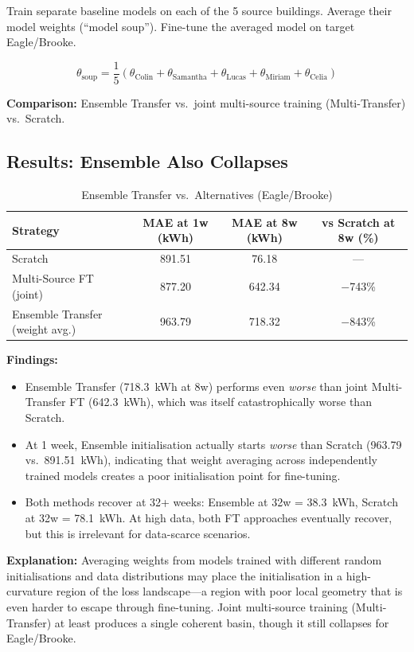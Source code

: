 \documentclass[12pt,a4paper]{report}
\begin{document}
Train separate baseline models on each of the 5 source buildings. Average their model weights (``model soup''). Fine-tune the averaged model on target Eagle/Brooke.

\[
\theta_{\text{soup}} = \frac{1}{5} (\theta_{\text{Colin}} + \theta_{\text{Samantha}} + \theta_{\text{Lucas}} + \theta_{\text{Miriam}} + \theta_{\text{Celia}})
\]

\textbf{Comparison:} Ensemble Transfer vs.\ joint multi-source training (Multi-Transfer) vs.\ Scratch.

\subsection{Results: Ensemble Also Collapses}

\begin{table}[H]
\centering
\caption{Ensemble Transfer vs.\ Alternatives (Eagle/Brooke)}
\small
\begin{tabular}{lccc}
\toprule
\textbf{Strategy} & \textbf{MAE at 1w (kWh)} & \textbf{MAE at 8w (kWh)} & \textbf{vs Scratch at 8w (\%)} \\
\midrule
Scratch & 891.51 & 76.18 & --- \\
Multi-Source FT (joint) & 877.20 & 642.34 & $-$743\% \\
Ensemble Transfer (weight avg.) & 963.79 & 718.32 & $-$843\% \\
\bottomrule
\end{tabular}
\end{table}

\textbf{Findings:}

\begin{itemize}
    \item Ensemble Transfer (718.3~kWh at 8w) performs even \textit{worse} than joint Multi-Transfer FT (642.3~kWh), which was itself catastrophically worse than Scratch.
    \item At 1 week, Ensemble initialisation actually starts \textit{worse} than Scratch (963.79 vs.\ 891.51~kWh), indicating that weight averaging across independently trained models creates a poor initialisation point for fine-tuning.
    \item Both methods recover at 32+ weeks: Ensemble at 32w = 38.3~kWh, Scratch at 32w = 78.1~kWh. At high data, both FT approaches eventually recover, but this is irrelevant for data-scarce scenarios.
\end{itemize}

\textbf{Explanation:} Averaging weights from models trained with different random initialisations and data distributions may place the initialisation in a high-curvature region of the loss landscape---a region with poor local geometry that is even harder to escape through fine-tuning. Joint multi-source training (Multi-Transfer) at least produces a single coherent basin, though it still collapses for Eagle/Brooke.
\end{document}
